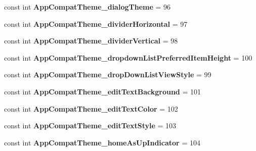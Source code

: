 \begin{DoxyCompactItemize}
const int {\bfseries App\+Compat\+Theme\+\_\+dialog\+Theme} = 96
\item 
\mbox{\label{classst_delivery_1_1_resource_1_1_styleable_affe037a13ee97b74c20785381ff51efb}} 
const int {\bfseries App\+Compat\+Theme\+\_\+divider\+Horizontal} = 97
\item 
\mbox{\label{classst_delivery_1_1_resource_1_1_styleable_a861024979f1977ade4c7016b55ddcaa6}} 
const int {\bfseries App\+Compat\+Theme\+\_\+divider\+Vertical} = 98
\item 
\mbox{\label{classst_delivery_1_1_resource_1_1_styleable_af1439db35dc910af31e61436f31a06c7}} 
const int {\bfseries App\+Compat\+Theme\+\_\+dropdown\+List\+Preferred\+Item\+Height} = 100
\item 
\mbox{\label{classst_delivery_1_1_resource_1_1_styleable_a6043c00658a59cb030fd167afbc0f068}} 
const int {\bfseries App\+Compat\+Theme\+\_\+drop\+Down\+List\+View\+Style} = 99
\item 
\mbox{\label{classst_delivery_1_1_resource_1_1_styleable_a25e5e4cafd97eb46ef01cba19e265d70}} 
const int {\bfseries App\+Compat\+Theme\+\_\+edit\+Text\+Background} = 101
\item 
\mbox{\label{classst_delivery_1_1_resource_1_1_styleable_a607a65a2ef160568043e2c87fd77407e}} 
const int {\bfseries App\+Compat\+Theme\+\_\+edit\+Text\+Color} = 102
\item 
\mbox{\label{classst_delivery_1_1_resource_1_1_styleable_a1a5e622a9b4969abebe981de724088b8}} 
const int {\bfseries App\+Compat\+Theme\+\_\+edit\+Text\+Style} = 103
\item 
\mbox{\label{classst_delivery_1_1_resource_1_1_styleable_a848f55cba64c1ab9532603df14985d9f}} 
const int {\bfseries App\+Compat\+Theme\+\_\+home\+As\+Up\+Indicator} = 104
\item 
\mbox{\label{classst_delivery_1_1_resource_1_1_styleable_a9910b223887c2dfc6cec64b1270e2530}} 

\end{DoxyCompactItemize}

